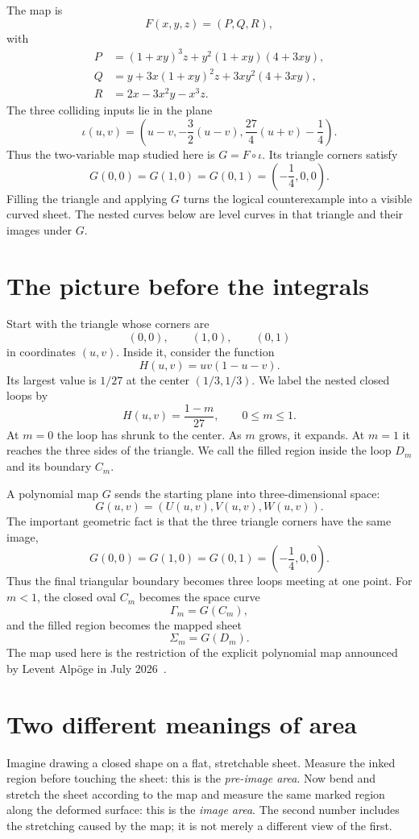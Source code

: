 \documentclass[11pt]{article}
\begin{document}
The map is
\[
F(x,y,z)=(P,Q,R),
\]
with
\begin{align*}
P&=(1+xy)^3z+y^2(1+xy)(4+3xy),\\
Q&=y+3x(1+xy)^2z+3xy^2(4+3xy),\\
R&=2x-3x^2y-x^3z.
\end{align*}
The three colliding inputs lie in the plane
\[
\iota(u,v)=\left(u-v,-\frac32(u-v),\frac{27}{4}(u+v)-\frac14\right).
\]
Thus the two-variable map studied here is $G=F\circ\iota$. Its triangle
corners satisfy
\[
G(0,0)=G(1,0)=G(0,1)=\left(-\frac14,0,0\right).
\]
Filling the triangle and applying $G$ turns the logical counterexample into a
visible curved sheet. The nested curves below are level curves in that
triangle and their images under $G$.

\section{The picture before the integrals}

Start with the triangle whose corners are
\[
(0,0),\qquad(1,0),\qquad(0,1)
\]
in coordinates $(u,v)$. Inside it, consider the function
\[
H(u,v)=uv(1-u-v).
\]
Its largest value is $1/27$ at the center $(1/3,1/3)$. We label the nested
closed loops by
\[
H(u,v)=\frac{1-m}{27},\qquad 0\leq m\leq1.
\]
At $m=0$ the loop has shrunk to the center. As $m$ grows, it expands. At
$m=1$ it reaches the three sides of the triangle. We call the filled region
inside the loop $D_m$ and its boundary $C_m$.

A polynomial map $G$ sends the starting plane into three-dimensional space:
\[
G(u,v)=(U(u,v),V(u,v),W(u,v)).
\]
The important geometric fact is that the three triangle corners have the same image,
\[
G(0,0)=G(1,0)=G(0,1)=\left(-\frac14,0,0\right).
\]
Thus the final triangular boundary becomes three loops meeting at one point.
For $m<1$, the closed oval $C_m$ becomes the space curve
\[
\Gamma_m=G(C_m),
\]
and the filled region becomes the mapped sheet
\[
\Sigma_m=G(D_m).
\]
The map used here is the restriction of the explicit polynomial map announced
by Levent Alp\"oge in July 2026~\cite{alpoge}.

\section{Two different meanings of area}

Imagine drawing a closed shape on a flat, stretchable sheet. Measure the inked
region before touching the sheet: this is the \emph{pre-image area}. Now bend
and stretch the sheet according to the map and measure the same marked region
along the deformed surface: this is the \emph{image area}. The second number
includes the stretching caused by the map; it is not merely a different view
of the first.
\end{document}
